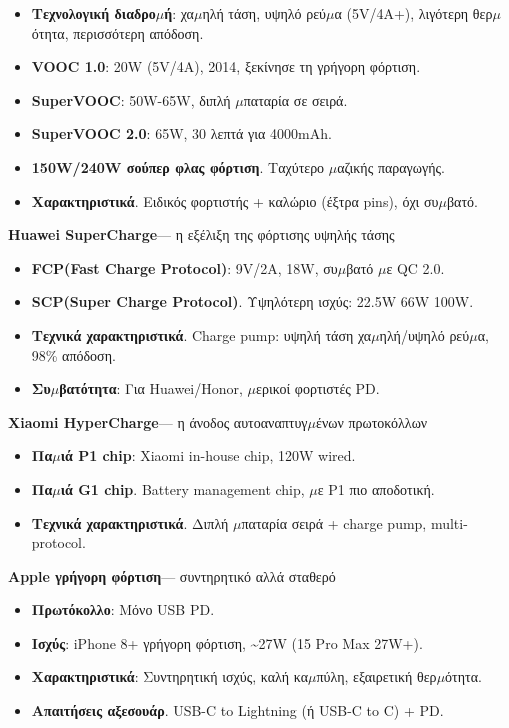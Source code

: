 \begin{itemize}
  \item \textbf{Τεχνολογική διαδρο$\mu$ή}: χα$\mu$ηλή τάση, υψηλό ρεύ$\mu$α (5V/4A+), λιγότερη θερ$\mu$ότητα, περισσότερη απόδοση.
  \item \textbf{VOOC 1.0}: 20W (5V/4A), 2014, ξεκίνησε τη γρήγορη φόρτιση.
  \item \textbf{SuperVOOC}: 50W-65W, διπλή $\mu$παταρία σε σειρά.
  \item \textbf{SuperVOOC 2.0}: 65W, 30 λεπτά για 4000mAh.
  \item \textbf{150W/240W σούπερ φλας φόρτιση}. Ταχύτερο $\mu$αζικής παραγωγής.
  \item \textbf{Χαρακτηριστικά}. Ειδικός φορτιστής + καλώριο (έξτρα pins), όχι συ$\mu$βατό.
\end{itemize}

\textbf{Huawei SuperCharge}— η εξέλιξη της φόρτισης υψηλής τάσης

\begin{itemize}
  \item \textbf{FCP(Fast Charge Protocol)}: 9V/2A, 18W, συ$\mu$βατό $\mu$ε QC 2.0.
  \item \textbf{SCP(Super Charge Protocol)}. Υψηλότερη ισχύς: 22.5W 66W 100W.
  \item \textbf{Τεχνικά χαρακτηριστικά}. Charge pump: υψηλή τάση χα$\mu$ηλή/υψηλό ρεύ$\mu$α, 98\% απόδοση.
  \item \textbf{Συ$\mu$βατότητα}: Για Huawei/Honor, $\mu$ερικοί φορτιστές PD.
\end{itemize}

\textbf{Xiaomi HyperCharge}— η άνοδος αυτοαναπτυγ$\mu$ένων πρωτοκόλλων

\begin{itemize}
  \item \textbf{Πα$\mu$ιά P1 chip}: Xiaomi in-house chip, 120W wired.
  \item \textbf{Πα$\mu$ιά G1 chip}. Battery management chip, $\mu$ε P1 πιο αποδοτική.
  \item \textbf{Τεχνικά χαρακτηριστικά}. Διπλή $\mu$παταρία σειρά + charge pump, multi-protocol.
\end{itemize}

\textbf{Apple γρήγορη φόρτιση}— συντηρητικό αλλά σταθερό

\begin{itemize}
  \item \textbf{Πρωτόκολλο}: Μόνο USB PD.
  \item \textbf{Ισχύς}: iPhone 8+ γρήγορη φόρτιση, \textasciitilde{}27W (15 Pro Max 27W+).
  \item \textbf{Χαρακτηριστικά}: Συντηρητική ισχύς, καλή κα$\mu$πύλη, εξαιρετική θερ$\mu$ότητα.
  \item \textbf{Απαιτήσεις αξεσουάρ}. USB-C to Lightning (ή USB-C to C) + PD.
\end{itemize}

